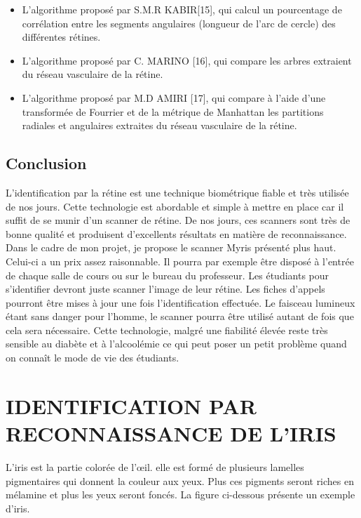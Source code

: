 \documentclass[overfullbox]{polytech/polytech}
\begin{document}
\begin{itemize}
\item L'algorithme proposé par S.M.R KABIR[15], qui calcul un pourcentage de corrélation entre les segments angulaires (longueur de l'arc de cercle) des différentes rétines.

\item L'algorithme proposé par C. MARINO [16], qui compare les arbres extraient du réseau vasculaire de la rétine.

\item L'algorithme proposé par M.D AMIRI [17],  qui compare à l'aide d'une transformée de Fourrier et de la métrique de Manhattan les partitions radiales et angulaires extraites du réseau vasculaire de la rétine.

\end{itemize}


\subsection{Conclusion}
L'identification par la rétine est une technique biométrique fiable et très utilisée de nos jours. Cette technologie est abordable et simple à mettre en place car il suffit de se munir d'un scanner de rétine. De nos jours, ces scanners sont très de bonne qualité et produisent d'excellents résultats en matière de reconnaissance.   Dans le cadre de mon projet, je propose le scanner Myris présenté plus haut. Celui-ci a un prix assez raisonnable. Il pourra par exemple être disposé à l'entrée de chaque salle de cours ou sur le bureau du professeur. Les étudiants pour s'identifier devront juste scanner l'image de leur rétine. Les fiches d'appels pourront être mises à jour une fois l'identification effectuée. Le faisceau lumineux étant sans danger pour l'homme, le scanner pourra être utilisé autant de fois que cela sera nécessaire. Cette technologie, malgré une fiabilité élevée reste très sensible au diabète et à l'alcoolémie ce qui peut poser un petit problème quand on connaît le mode de vie des étudiants. 




\section{IDENTIFICATION PAR RECONNAISSANCE DE L'IRIS}
L'iris est la partie colorée de l'œil. elle est formé de plusieurs lamelles pigmentaires qui donnent la couleur aux yeux. Plus ces pigments seront riches en mélamine et plus les yeux seront foncés. La figure ci-dessous présente un exemple d'iris.
\end{document}
